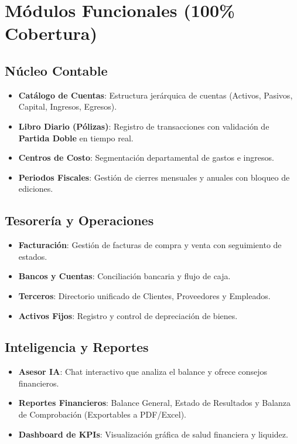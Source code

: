 \documentclass[11pt,a4paper]{article}
\begin{document}
\section{Módulos Funcionales (100\% Cobertura)}

\subsection{Núcleo Contable}
\begin{itemize}
    \item \textbf{Catálogo de Cuentas}: Estructura jerárquica de cuentas (Activos, Pasivos, Capital, Ingresos, Egresos).
    \item \textbf{Libro Diario (Pólizas)}: Registro de transacciones con validación de \textbf{Partida Doble} en tiempo real.
    \item \textbf{Centros de Costo}: Segmentación departamental de gastos e ingresos.
    \item \textbf{Periodos Fiscales}: Gestión de cierres mensuales y anuales con bloqueo de ediciones.
\end{itemize}

\subsection{Tesorería y Operaciones}
\begin{itemize}
    \item \textbf{Facturación}: Gestión de facturas de compra y venta con seguimiento de estados.
    \item \textbf{Bancos y Cuentas}: Conciliación bancaria y flujo de caja.
    \item \textbf{Terceros}: Directorio unificado de Clientes, Proveedores y Empleados.
    \item \textbf{Activos Fijos}: Registro y control de depreciación de bienes.
\end{itemize}

\subsection{Inteligencia y Reportes}
\begin{itemize}
    \item \textbf{Asesor IA}: Chat interactivo que analiza el balance y ofrece consejos financieros.
    \item \textbf{Reportes Financieros}: Balance General, Estado de Resultados y Balanza de Comprobación (Exportables a PDF/Excel).
    \item \textbf{Dashboard de KPIs}: Visualización gráfica de salud financiera y liquidez.
\end{itemize}
\end{document}
